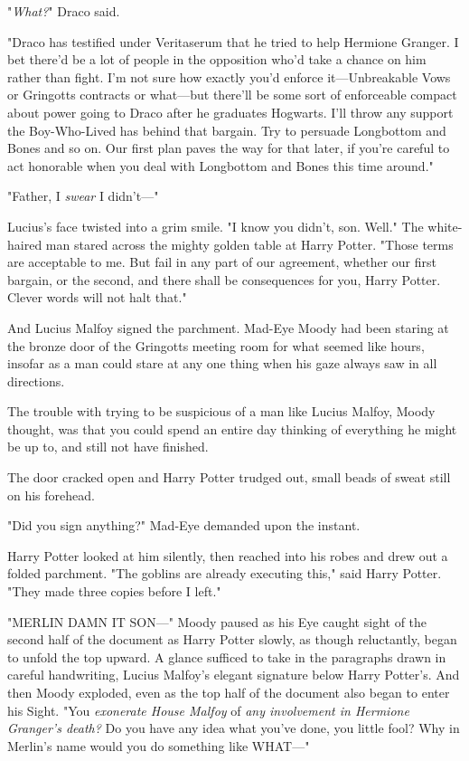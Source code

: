 "\emph{What?}" Draco said.

"Draco has testified under Veritaserum that he tried to help Hermione Granger. 
I bet there'd be a lot of people in the opposition who'd take a chance on him 
rather than fight. I'm not sure how exactly you'd enforce it---Unbreakable Vows 
or Gringotts contracts or what---but there'll be some sort of enforceable 
compact about power going to Draco after he graduates Hogwarts. I'll throw any 
support the Boy-Who-Lived has behind that bargain. Try to persuade Longbottom 
and Bones and so on. Our first plan paves the way for that later, if you're 
careful to act honorable when you deal with Longbottom and Bones this time 
around."

"Father, I \emph{swear} I didn't---"

Lucius's face twisted into a grim smile. "I know you didn't, son. Well." The 
white-haired man stared across the mighty golden table at Harry Potter. "Those 
terms are acceptable to me. But fail in any part of our agreement, whether our 
first bargain, or the second, and there shall be consequences for you, Harry 
Potter. Clever words will not halt that."

And Lucius Malfoy signed the parchment.
\sbreak
Mad-Eye Moody had been staring at the bronze door of the Gringotts meeting room 
for what seemed like hours, insofar as a man could stare at any one thing when 
his gaze always saw in all directions.

The trouble with trying to be suspicious of a man like Lucius Malfoy, Moody 
thought, was that you could spend an entire day thinking of everything he might 
be up to, and still not have finished.

The door cracked open and Harry Potter trudged out, small beads of sweat still 
on his forehead.

"Did you sign anything?" Mad-Eye demanded upon the instant.

Harry Potter looked at him silently, then reached into his robes and drew out a 
folded parchment. "The goblins are already executing this," said Harry Potter. 
"They made three copies before I left."

"MERLIN DAMN IT SON---" Moody paused as his Eye caught sight of the second half 
of the document as Harry Potter slowly, as though reluctantly, began to unfold 
the top upward. A glance sufficed to take in the paragraphs drawn in careful 
handwriting, Lucius Malfoy's elegant signature below Harry Potter's. And then 
Moody exploded, even as the top half of the document also began to enter his 
Sight. "You \emph{exonerate House Malfoy} of \emph{any involvement in Hermione 
Granger's death?} Do you have any idea what you've done, you little fool? Why 
in Merlin's name would you do something like WHAT---"
